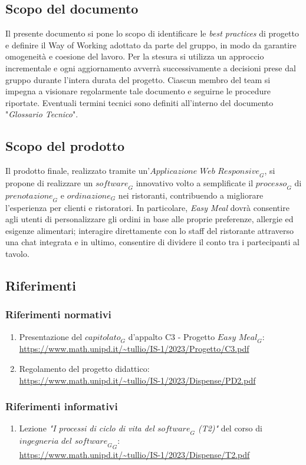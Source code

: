 \subsection{Scopo del documento}
Il presente documento si pone lo scopo di identificare le \emph{best practices} di progetto e definire il Way of Working adottato da parte del gruppo, in modo da garantire omogeneità e coesione del lavoro. Per la stesura si utilizza un approccio incrementale e ogni aggiornamento avverrà successivamente a decisioni prese dal gruppo durante l'intera durata del progetto. Ciascun membro del team si impegna a visionare regolarmente tale documento e seguirne le procedure riportate.
Eventuali termini tecnici sono definiti all'interno del documento "\emph{Glossario Tecnico}".
\subsection{Scopo del prodotto}
Il prodotto finale, realizzato tramite un'$\textit{Applicazione Web Responsive}_G$, si propone di realizzare un $\textit{software}_G$ innovativo volto a semplificate il $\textit{processo}_G$ di $\textit{prenotazione}_G$ e $\textit{ordinazione}_G$ nei ristoranti, contribuendo a migliorare l'esperienza per clienti e ristoratori. In particolare, \textit{Easy Meal} dovrà consentire agli utenti di personalizzare gli ordini in base alle proprie preferenze, allergie ed esigenze alimentari; interagire direttamente con lo staff del ristorante attraverso una chat integrata e in ultimo, consentire di dividere il conto tra i partecipanti al tavolo.
\subsection{Riferimenti}
\subsubsection{Riferimenti normativi}
\begin{enumerate}
    \item Presentazione del $\textit{capitolato}_G$ d'appalto C3 - Progetto $\textit{Easy Meal}_G$: \\ \url{https://www.math.unipd.it/~tullio/IS-1/2023/Progetto/C3.pdf}
    \item Regolamento del progetto didattico: \\ 
    \url{https://www.math.unipd.it/~tullio/IS-1/2023/Dispense/PD2.pdf}
\end{enumerate}
\subsubsection{Riferimenti informativi}
\begin{enumerate}
    \item Lezione \emph{"I processi di ciclo di vita del $\textit{software}_G$ (T2)"} del corso di $\textit{ingegneria del $\textit{software}_G$}_G$: \\
    \url{https://www.math.unipd.it/~tullio/IS-1/2023/Dispense/T2.pdf}
\end{enumerate}